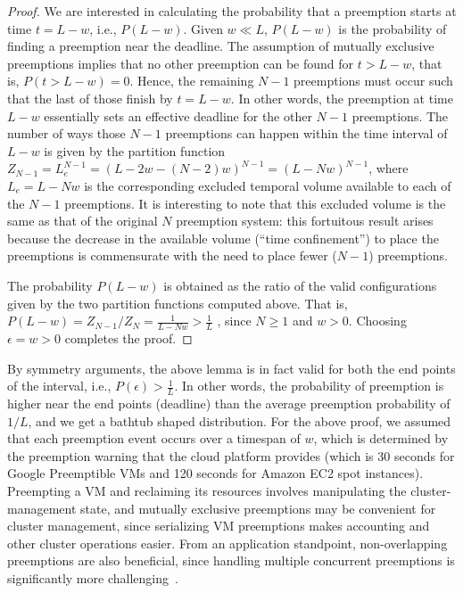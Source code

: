 \begin{proof}
We are interested in calculating the probability that a preemption starts at time $t=L-w$, i.e., $P(L-w)$. Given $w \ll L$, $P(L-w)$ is the probability of finding a preemption near the deadline. The assumption of mutually exclusive preemptions implies that no other preemption can be found for $t > L - w$, that is, $P(t> L-w) = 0$. Hence, the remaining $N-1$ preemptions must occur such that the last of those finish by $t=L-w$. In other words, the preemption at time $L-w$ essentially sets an effective deadline for the other $N-1$ preemptions. The number of ways those $N-1$ preemptions can happen within the time interval of $L-w$ is given by the partition function $Z_{N-1} = L_e^{N-1}= (L-2w - (N-2)w)^{N-1} = (L - Nw)^{N-1}$, where $L_e = L - Nw$ is the corresponding excluded temporal volume available to each of the $N-1$ preemptions.
It is interesting to note that this excluded volume
is the same as that of the original $N$ preemption system: this fortuitous result arises because the decrease in the available volume (``time confinement'') to place the preemptions is commensurate with the need to place fewer ($N-1$) preemptions.

The probability $P(L-w)$ is obtained as the ratio of the valid configurations given by the two partition functions computed above.
That is, 
$P(L-w) = Z_{N-1}/ {Z_N} = \frac{1}{L - Nw} > \frac{1}{L}$ , since $N \geq 1$ and $w>0$. Choosing $\epsilon = w > 0$ completes the proof.
\end{proof}

By symmetry arguments, the above lemma is in fact valid for both the end points of the interval, i.e., $P(\epsilon) > \frac{1}{L}$.
In other words, the probability of preemption is higher near the end points (deadline) than the average preemption probability of $1/L$, and we get a bathtub shaped distribution.
For the above proof, we assumed that each preemption event occurs over a timespan of $w$, which is determined by the preemption warning that the cloud platform provides (which is 30 seconds for Google Preemptible VMs and 120 seconds for Amazon EC2 spot instances). 
Preempting a VM and reclaiming its resources involves manipulating the cluster-management state, and mutually exclusive preemptions may be convenient for cluster management, since serializing VM preemptions makes accounting and other cluster operations easier.
From an application standpoint, non-overlapping preemptions are also beneficial, since handling multiple concurrent preemptions is significantly more challenging~\cite{exosphere}. 



